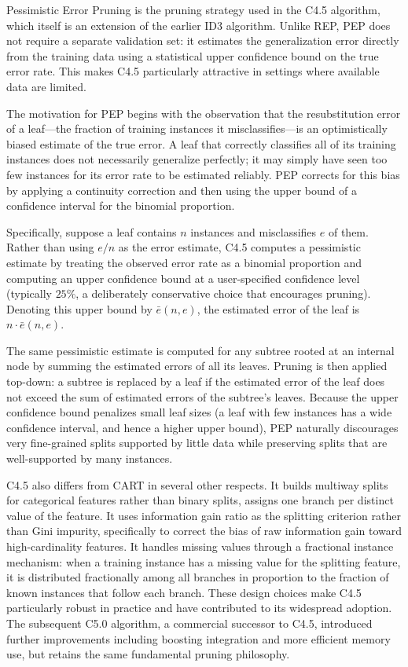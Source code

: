 Pessimistic Error Pruning is the pruning strategy used in the C4.5 algorithm, which itself is an extension of the earlier ID3 algorithm. Unlike REP, PEP does
not require a separate validation set: it estimates the generalization error directly from
the training data using a statistical upper confidence bound on the true error rate. This
makes C4.5 particularly attractive in settings where available data are limited.

The motivation for PEP begins with the observation that the resubstitution error of a
leaf---the fraction of training instances it misclassifies---is an optimistically biased
estimate of the true error. A leaf that correctly classifies all of its training instances
does not necessarily generalize perfectly; it may simply have seen too few instances for its
error rate to be estimated reliably. PEP corrects for this bias by applying a continuity
correction and then using the upper bound of a confidence interval for the binomial
proportion.

Specifically, suppose a leaf contains $n$ instances and misclassifies $e$ of them. Rather
than using $e/n$ as the error estimate, C4.5 computes a pessimistic estimate by treating
the observed error rate as a binomial proportion and computing an upper confidence bound at
a user-specified confidence level (typically $25\%$, a deliberately conservative choice
that encourages pruning). Denoting this upper bound by $\bar{e}(n, e)$, the estimated error
of the leaf is $n \cdot \bar{e}(n, e)$.

The same pessimistic estimate is computed for any subtree rooted at an internal node by
summing the estimated errors of all its leaves. Pruning is then applied top-down: a subtree
is replaced by a leaf if the estimated error of the leaf does not exceed the sum of
estimated errors of the subtree's leaves. Because the upper confidence bound penalizes small
leaf sizes (a leaf with few instances has a wide confidence interval, and hence a higher
upper bound), PEP naturally discourages very fine-grained splits supported by little data
while preserving splits that are well-supported by many instances.

C4.5 also differs from CART in several other respects. It builds multiway splits for
categorical features rather than binary splits, assigns one branch per distinct value of
the feature. It uses information gain ratio as the splitting criterion rather than Gini
impurity, specifically to correct the bias of raw information gain toward high-cardinality
features. It handles missing values through a fractional instance mechanism: when a training
instance has a missing value for the splitting feature, it is distributed fractionally among
all branches in proportion to the fraction of known instances that follow each branch. These
design choices make C4.5 particularly robust in practice and have contributed to its
widespread adoption. The subsequent C5.0 algorithm, a commercial successor to C4.5,
introduced further improvements including boosting integration and more efficient memory
use, but retains the same fundamental pruning philosophy.


